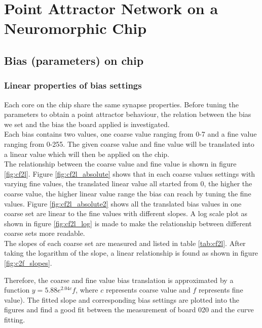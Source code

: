 \chapter{Point Attractor Network on a Neuromorphic Chip}

\section{Bias (parameters) on chip}
\subsection{Linear properties of bias settings}
Each core on the chip share the same synapse properties. Before tuning the parameters to obtain a point attractor behaviour, the relation between the bias we set and the bias the board applied is investigated.\\

Each bias contains two values, one coarse value ranging from 0-7 and a fine value ranging from 0-255.
The given coarse value and fine value will be translated into a linear value which will then be applied on the chip.\\

The relationship between the coarse value and fine value is shown in figure \ref{fig:cf2l}.
Figure \ref{fig:cf2l_absolute} shows that in each coarse values settings with varying fine values, the translated linear value all started from 0, the higher the coarse value, the higher linear value range the bias can reach by tuning the fine values.
Figure \ref{fig:cf2l_absolute2} shows all the translated bias values in one coarse set are linear to the fine values with different slopes.
A log scale plot as shown in figure \ref{fig:cf2l_log} is made to make the relationship between different coarse sets more readable.\\


The slopes of each coarse set are measured and listed in table \ref{tab:cf2l}.
After taking the logarithm of the slope, a linear relationship is found as shown in figure \ref{fig:c2f_slopes}.

Therefore, the coarse and fine value bias translation is approximated by a function  $y=5.88e^{2.04c}f$, where $c$ represents coarse value and $f$ represents fine value). The fitted slope and corresponding bias settings are plotted into the figures and find a good fit between the measurement of board 020 and the curve fitting.

